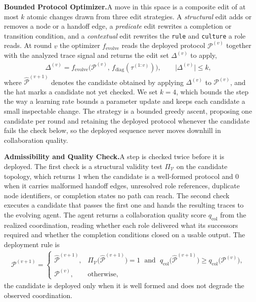 \documentclass{article} %
\begin{document}
\textbf{Bounded Protocol Optimizer.}\quad A move in this space is a composite edit of at most $k$ atomic changes drawn from three edit strategies. A \emph{structural} edit adds or removes a node or a handoff edge, a \emph{predicate} edit rewrites a completion or transition condition, and a \emph{contextual} edit rewrites the \texttt{rule} and \texttt{culture} a role reads. At round $v$ the optimizer $f_{\mathrm{evolve}}$ reads the deployed protocol $\mathcal{P}^{(v)}$ together with the analyzed trace signal and returns the edit set $\Delta^{(v)}$ to apply,
\begin{gather}
    \Delta^{(v)} = f_{\mathrm{evolve}}\bigl(\mathcal{P}^{(v)},\, f_{\mathrm{diag}}(\tau^{(1{:}v)})\bigr), \qquad \bigl|\Delta^{(v)}\bigr| \le k,
\end{gather}
where $\hat{\mathcal{P}}^{(v+1)}$ denotes the candidate obtained by applying $\Delta^{(v)}$ to $\mathcal{P}^{(v)}$, and the hat marks a candidate not yet checked.
We set $k=4$, which bounds the step the way a learning rate bounds a parameter update and keeps each candidate a small inspectable change. The strategy is a bounded greedy ascent, proposing one candidate per round and retaining the deployed protocol whenever the candidate fails the check below, so the deployed sequence never moves downhill in collaboration quality.

\textbf{Admissibility and Quality Check.}\quad A step is checked twice before it is deployed. The first check is a structural validity test $\Pi_{\mathcal{V}}$ on the candidate topology, which returns $1$ when the candidate is a well-formed protocol and $0$ when it carries malformed handoff edges, unresolved role references, duplicate node identifiers, or completion states no path can reach. The second check executes a candidate that passes the first one and hands the resulting traces to the evolving agent. The agent returns a collaboration quality score $q_{\mathrm{col}}$ from the realized coordination, reading whether each role delivered what its successors required and whether the completion conditions closed on a usable output. The deployment rule is
\begin{gather}
    \mathcal{P}^{(v+1)} =
    \begin{cases}
        \hat{\mathcal{P}}^{(v+1)}, & \Pi_{\mathcal{V}}\bigl(\hat{\mathcal{P}}^{(v+1)}\bigr) = 1 \;\text{ and }\; q_{\mathrm{col}}\bigl(\hat{\mathcal{P}}^{(v+1)}\bigr) \ge q_{\mathrm{col}}\bigl(\mathcal{P}^{(v)}\bigr),\\[2pt]
        \mathcal{P}^{(v)}, & \text{otherwise},
    \end{cases}
\end{gather}
the candidate is deployed only when it is well formed and does not degrade the observed coordination.
\end{document}
